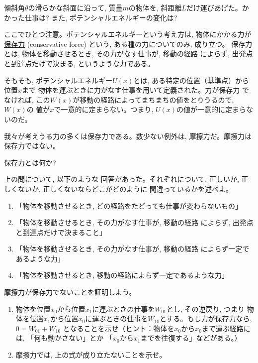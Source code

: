 \begin{q}\label{q:slope_lift_energy1}
傾斜角$\theta$の滑らかな斜面に沿って, 質量$m$の物体を, 斜距離$L$だけ運びあげた。かかった仕事は? 
また, ポテンシャルエネルギーの変化は? 
\end{q}
\mv

ここでひとつ注意。ポテンシャルエネルギーという考え方は, 物体にかかる力が
\underline{保存力} (conservative force)
という, ある種の力についてのみ, 成り立つ。
保存力とは, 物体を移動させるとき, その力がなす仕事が, 移動の経路
によらず, 出発点と到達点だけで決まる, というような力である。

そもそも, ポテンシャルエネルギー$U(x)$とは, ある特定の位置（基準点）から位置$x$まで
物体を運ぶときに力がなす仕事を用いて定義された。力が保存力
でなければ, この$W(x)$が移動の経路によってまちまちの値をとりうるので, $W(x)$の
値が$x$で一意的に定まらない。つまり, $U(x)$の値が一意的に定まらないのだ。

我々が考えうる力の多くは保存力である。数少ない例外は, 摩擦力だ。摩擦力は保存力ではない。
\mv

%
\begin{q}\label{q:conservative_force}
保存力とは何か? 
\end{q}
\mv

\begin{q}\label{q:NewtonLaw_mistake} 上の問について, 以下のような
回答があった。それぞれについて, 正しいか, 正しくないか, 正しくないならどこがどのように
間違っているかを述べよ。
\begin{enumerate}
\item 「物体を移動させるとき, どの経路をたどっても仕事が変わらないもの」
\item 「物体を移動させるとき, その力がなす仕事が, 移動の経路
によらず, 出発点と到達点だけで決まること」
\item 「物体を移動させるとき, その力がなす仕事が, 移動の経路
によらず一定であるような力」
\item 「物体を移動させるとき, 移動の経路によらず一定であるような力」
\end{enumerate}
\end{q}


%
\begin{q}\label{q:friction_non_conservative}
摩擦力が保存力でないことを証明しよう。
\begin{enumerate}
\item 物体を位置$x_0$から位置$x_1$に運ぶときの仕事を$W_{01}$とし, その逆戻り, つまり
物体を位置$x_1$から位置$x_0$に運ぶときの仕事を$W_{10}$とする。もし力が保存力なら, 
$0=W_{01}+W_{10}$
となることを示せ（ヒント：物体を$x_0$から$x_0$まで運ぶ経路には, 「何も動かさない」とか
「$x_0$から$x_1$までを往復する」などがある。）
\item 摩擦力では, 上の式が成り立たないことを示せ。
\end{enumerate}
\end{q}
\mv

